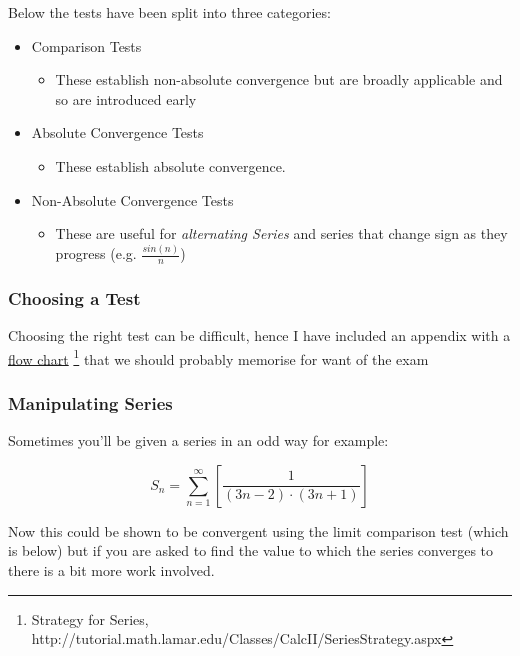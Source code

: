 \documentclass[class=article, crop=false]{standalone}
\begin{document}
Below the tests have been split into three categories:

\begin{itemize}
\item
  Comparison Tests

  \begin{itemize}
  \item
    These establish non-absolute convergence but are broadly applicable
    and so are introduced early
  \end{itemize}
\item
  Absolute Convergence Tests

  \begin{itemize}
  \item
    These establish absolute convergence.
  \end{itemize}
\item
  Non-Absolute Convergence Tests

  \begin{itemize}
  \item
    These are useful for \emph{alternating Series} and series that
    change sign as they progress (e.g. \(\frac{sin(n)}{n}\))
  \end{itemize}
\end{itemize}

\hypertarget{header-n3203}{%
\subsubsection{Choosing a Test}\label{header-n3203}}

Choosing the right test can be difficult, hence I have included an
appendix with a
\href{http://tutorial.math.lamar.edu/Classes/CalcII/SeriesStrategy.aspx}{flow
chart} \footnote{Strategy for Series,
  http://tutorial.math.lamar.edu/Classes/CalcII/SeriesStrategy.aspx}
that we should probably memorise for want of the exam



\hypertarget{header-n3206}{%
\subsubsection{Manipulating Series}\label{header-n3206}}

Sometimes you'll be given a series in an odd way for example:

\[S_n = \sum^\infty_{n=1} \left[ \frac{1}{(3n-2)\cdot (3n+1)} \right]\]

Now this could be shown to be convergent using the limit comparison test
(which is below) but if you are asked to find the value to which the
series converges to there is a bit more work involved.
\end{document}
